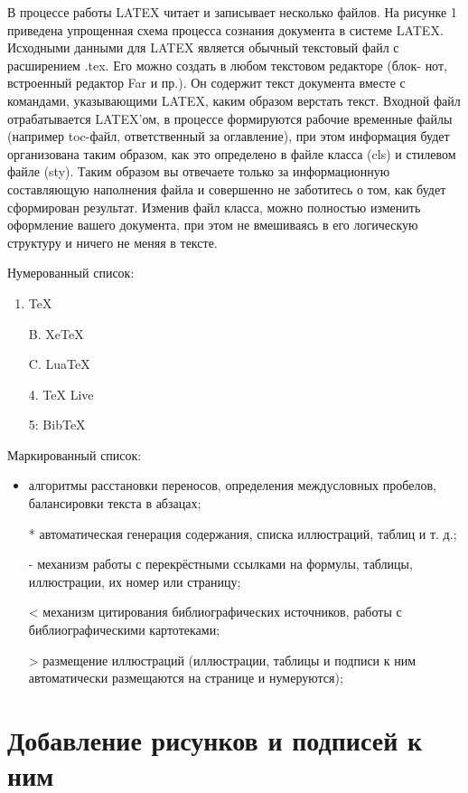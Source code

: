 \documentclass{article} %
\begin{document}
В процессе работы LATEX читает и записывает несколько файлов. На рисунке 1 приведена упрощенная схема процесса сознания документа в системе LATEX. Исходными данными для LATEX является обычный текстовый файл с расширением .tex. Его можно создать в любом текстовом редакторе (блок- нот, встроенный редактор Far и пр.). Он содержит текст документа вместе с командами, указывающими LATEX, каким образом верстать текст. 
Входной файл отрабатывается LATEX’ом, в процессе формируются рабочие временные файлы (например toc-файл, ответственный за оглавление), при этом информация будет организована таким образом, как это определено в файле класса (cls) и стилевом файле (sty). Таким образом вы отвечаете только за информационную составляющую наполнения файла и совершенно не заботитесь о том, как будет сформирован результат. Изменив файл класса, можно полностью изменить оформление вашего документа, при этом не вмешиваясь в его логическую структуру и ничего не меняя в тексте. 


Нумерованный список:
\begin{enumerate} %
    \item TeX 
    \item[B.] XeTeX 
    \item[C.] LuaTeX
    \item[4.] TeX Live
    \item[5:]  BibTeX   
\end{enumerate} 

Маркированный список:
\begin{itemize}%
	\item алгоритмы расстановки переносов, определения междусловных пробелов, балансировки текста в абзацах;
    \item[*] автоматическая генерация содержания, списка иллюстраций, таблиц и т. д.;
    \item[-] механизм работы с перекрёстными ссылками на формулы, таблицы, иллюстрации, их номер или страницу;
    \item[<] механизм цитирования библиографических источников, работы с библиографическими картотеками;
    \item[>] размещение иллюстраций (иллюстрации, таблицы и подписи к ним автоматически размещаются на странице и нумеруются);
\end{itemize}

\section{Добавление рисунков и подписей к ним}
\end{document}

